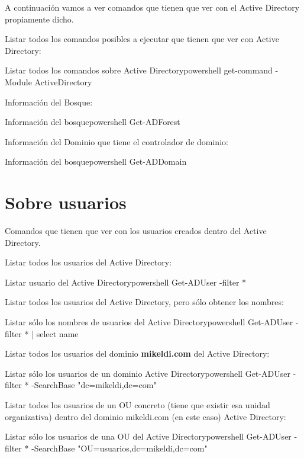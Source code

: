 A continuación  vamos a ver comandos que tienen que ver con el Active Directory propiamente dicho.

Listar todos los comandos posibles a ejecutar que tienen que ver con Active Directory:


\begin{mycode}{Listar todos los comandos sobre Active Directory}{powershell}{}
get-command -Module ActiveDirectory
\end{mycode}


Información del Bosque:
\begin{mycode}{Información del bosque}{powershell}{}
Get-ADForest
\end{mycode}


Información del Dominio que tiene el controlador de dominio:
\begin{mycode}{Información del bosque}{powershell}{}
Get-ADDomain
\end{mycode}


\section{Sobre usuarios}

Comandos que tienen que ver con los usuarios creados dentro del Active Directory.

Listar todos los usuarios del Active Directory:
\begin{mycode}{Listar usuario del Active Directory}{powershell}{}
Get-ADUser -filter *
\end{mycode}

Listar todos los usuarios del Active Directory, pero sólo obtener los nombres:
\begin{mycode}{Listar sólo los nombres de usuarios del Active Directory}{powershell}{}
Get-ADUser -filter * | select name
\end{mycode}


Listar todos los usuarios del dominio \textbf{mikeldi.com} del Active Directory:
\begin{mycode}{Listar sólo los  usuarios de un dominio Active Directory}{powershell}{}
Get-ADUser -filter * -SearchBase "dc=mikeldi,dc=com"
\end{mycode}


Listar todos los usuarios de un OU concreto (tiene que existir esa unidad organizativa) dentro del dominio mikeldi.com (en este caso) Active Directory:
\begin{mycode}{Listar sólo los  usuarios de una OU del Active Directory}{powershell}{}
Get-ADUser -filter * -SearchBase "OU=usuarios,dc=mikeldi,dc=com"
\end{mycode}

